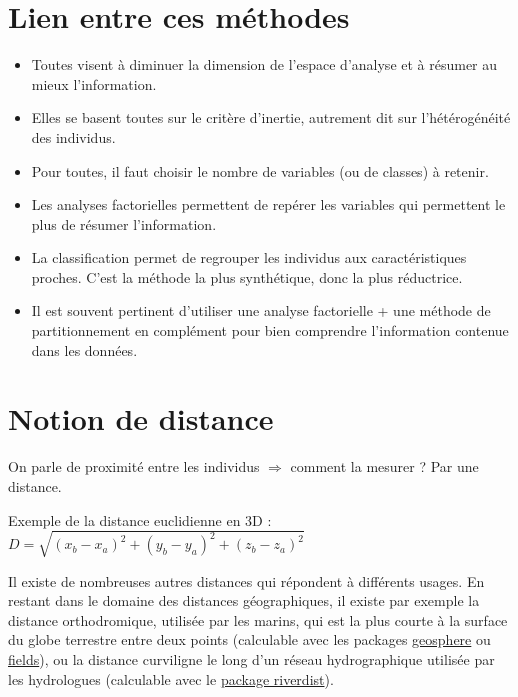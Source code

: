 \documentclass[]{book}
\providecommand{\tightlist}{%
  \setlength{\itemsep}{0pt}\setlength{\parskip}{0pt}}
\begin{document}
\hypertarget{lien-entre-ces-methodes}{%
\section{Lien entre ces méthodes}\label{lien-entre-ces-methodes}}

\begin{itemize}
\tightlist
\item
  Toutes visent à diminuer la dimension de l'espace d'analyse et à résumer au mieux l'information.
\item
  Elles se basent toutes sur le critère d'inertie, autrement dit sur l'hétérogénéité des individus.
\item
  Pour toutes, il faut choisir le nombre de variables (ou de classes) à retenir.
\item
  Les analyses factorielles permettent de repérer les variables qui permettent le plus de résumer l'information.
\item
  La classification permet de regrouper les individus aux caractéristiques proches. C'est la méthode la plus synthétique, donc la plus réductrice.
\item
  Il est souvent pertinent d'utiliser une analyse factorielle + une méthode de partitionnement en complément pour bien comprendre l'information contenue dans les données.
\end{itemize}

\hypertarget{notion-de-distance}{%
\section{Notion de distance}\label{notion-de-distance}}

On parle de proximité entre les individus \(\Rightarrow\) comment la mesurer ? Par une distance.

Exemple de la distance euclidienne en 3D : \(D = \sqrt{(x_{b}-x_{a})^2+(y_{b}-y_{a})^2+(z_{b}-z_{a})^2}\)

Il existe de nombreuses autres distances qui répondent à différents usages. En restant dans le domaine des distances géographiques, il existe par exemple la distance orthodromique, utilisée par les marins, qui est la plus courte à la surface du globe terrestre entre deux points (calculable avec les packages \href{https://cran.r-project.org/web/packages/geosphere/geosphere.pdf}{geosphere} ou \href{https://cran.r-project.org/web/packages/fields/fields.pdf}{fields}), ou la distance curviligne le long d'un réseau hydrographique utilisée par les hydrologues (calculable avec le \href{https://cran.r-project.org/web/packages/riverdist/riverdist.pdf}{package riverdist}).
\end{document}
